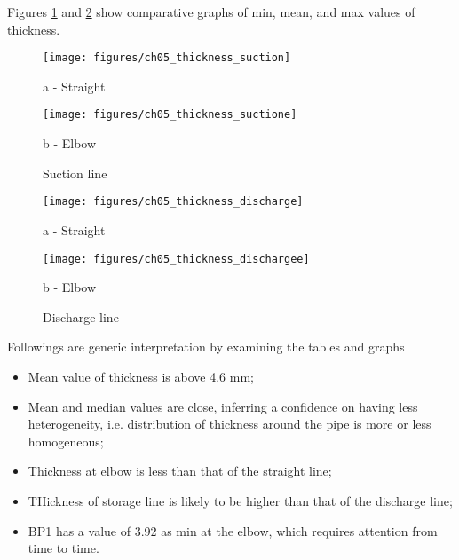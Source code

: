 \begin{table}[h]
{	}
\end{table}

Figures \ref{ch05_thickness_suction} and \ref{ch05_thickness_dicharge} show comparative graphs of min, mean, and max values of thickness.


\begin{figure}[!htb]
	\begin{minipage}[b]{0.5\linewidth}
		\centering
		\texttt{[image: figures/ch05\_thickness\_suction]}
		\caption*{a - Straight} 
	\end{minipage}
	\hspace{0.05cm}
	\begin{minipage}[b]{0.5\linewidth}
		\centering
		\texttt{[image: figures/ch05\_thickness\_suctione]}
		\caption*{b - Elbow} 
	\end{minipage}
	\caption{Suction line}
	\label{ch05_thickness_suction}
\end{figure}

\begin{figure}[!htb]
	\begin{minipage}[b]{0.5\linewidth}
		\centering
		\texttt{[image: figures/ch05\_thickness\_discharge]}
		\caption*{a - Straight} 
	\end{minipage}
	\hspace{0.05cm}
	\begin{minipage}[b]{0.5\linewidth}
		\centering
		\texttt{[image: figures/ch05\_thickness\_dischargee]}
		\caption*{b - Elbow} 
	\end{minipage}
	\caption{Discharge line}
	\label{ch05_thickness_dicharge}
\end{figure}

Followings are generic interpretation by examining the tables and graphs
\begin{itemize}
\item Mean value of thickness is above 4.6 mm;
\item Mean and median values are close, inferring a confidence on having less heterogeneity, i.e. distribution of thickness around the pipe is more or less homogeneous;
\item Thickness at elbow is less than that of the straight line;
\item THickness of storage line is likely to be higher than that of the discharge line;
\item BP1 has a value of 3.92 as min at the elbow, which requires attention from time to time.
\end{itemize}

